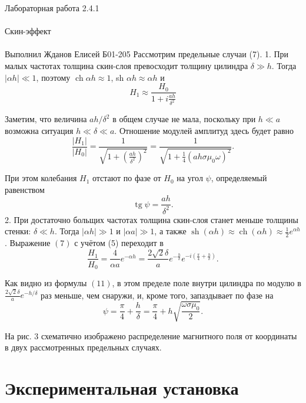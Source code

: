 \documentclass{astroedu-lab}
\begin{document}
\begin{problem}{\huge Лабораторная работа 2.4.1\\\\Скин-эффект\\\\Выполнил Жданов Елисей Б01-205}
Рассмотрим предельные случаи (7).
1. При малых частотах толщина скин-слоя превосходит толщину цилиндра $\delta \gg h$. Тогда $|\alpha h| \ll 1$, поэтому $\operatorname{ch} \alpha h \approx 1$, sh $\alpha h \approx \alpha h$ и
$$
H_1 \approx \frac{H_0}{1+i \frac{a h}{\delta^2}}
$$

Заметим, что величина $a h / \delta^2$ в общем случае не мала, поскольку при $h \ll a$ возможна ситуация $h \ll \delta \ll a$. Отношение модулей амплитуд здесь будет равно
$$
\frac{\left|H_1\right|}{\left|H_0\right|}=\frac{1}{\sqrt{1+\left(\frac{a h}{\delta^2}\right)^2}}=\frac{1}{\sqrt{1+\frac{1}{4}\left(a h \sigma \mu_0 \omega\right)^2}} .
$$

При этом колебания $H_1$ отстают по фазе от $H_0$ на угол $\psi$, определяемый равенством
$$
\operatorname{tg} \psi=\frac{a h}{\delta^2} .
$$
2. При достаточно больщих частотах толщина скин-слоя станет меньше толщины стенки: $\delta \ll h$. Тогда $|\alpha h| \gg 1$ и $|\alpha a| \gg 1$, а также $\operatorname{sh}(\alpha h) \approx \operatorname{ch}(\alpha h) \approx \frac{1}{2} e^{\alpha h}$. Выражение $(7)$ с учётом (5) переходит в
$$
\frac{H_1}{H_0}=\frac{4}{\alpha a} e^{-\alpha h}=\frac{2 \sqrt{2} \delta}{a} e^{-\frac{h}{\delta}} e^{-i\left(\frac{\pi}{4}+\frac{h}{\delta}\right)} .
$$

Как видно из формулы $(11)$, в этом пределе поле внутри цилиндра по модулю в $\frac{2 \sqrt{2} \delta}{a} e^{-h / \delta}$ раз меньше, чем снаружи, и, кроме того, запаздывает по фазе на
$$
\psi=\frac{\pi}{4}+\frac{h}{\delta}=\frac{\pi}{4}+h \sqrt{\frac{\omega \sigma \mu_0}{2}} .
$$

На рис. 3 схематично изображено распределение магнитного поля от координаты в двух рассмотренных предельных случаях.

\section{Экспериментальная установка}


\end{problem}
\end{document}
